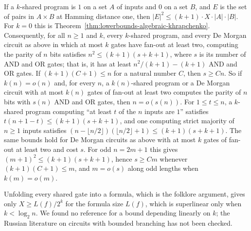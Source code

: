 \begin{theorem}
  If a $k$-shared program is $1$ on a set $A$ of inputs and $0$ on a set $B$,
  and $E$ is the set of pairs in $A \times B$ at Hamming distance one, then
  $|E|^2 \le (k + 1) \cdot X \cdot |A| \cdot |B|$. For $k = 0$ this is
  Theorem~\ref{thm:lowerbounds-algebraic-khrapchenko}. Consequently, for all
  $n \ge 1$ and $k$, every $k$-shared program, and every De Morgan circuit as
  above in which at most $k$ gates have fan-out at least two, computing the
  parity of $n$ bits satisfies $n^2 \le (k + 1)(s + k + 1)$, where $s$ is its
  number of AND and OR gates; that is, it has at least $n^2/(k + 1) - (k + 1)$
  AND and OR gates. If $(k + 1)(C + 1) \le n$ for a natural number $C$, then
  $s \ge C n$. So if $k(n) = o(n)$ and, for every $n$, a $k(n)$-shared program
  or a De Morgan circuit with at most $k(n)$ gates of fan-out at least two
  computes the parity of $n$ bits with $s(n)$ AND and OR gates, then
  $n = o(s(n))$. For $1 \le t \le n$, a $k$-shared program computing ``at least
  $t$ of the $n$ inputs are $1$'' satisfies
  $t(n + 1 - t) \le (k + 1)(s + k + 1)$, and one computing strict majority of
  $n \ge 1$ inputs satisfies
  $(n - \lfloor n/2 \rfloor)(\lfloor n/2 \rfloor + 1) \le (k + 1)(s + k + 1)$.
  The same bounds hold for De Morgan circuits as above with at most $k$ gates
  of fan-out at least two and cost $s$. For odd $n = 2m + 1$ this gives
  $(m + 1)^2 \le (k + 1)(s + k + 1)$, hence $s \ge Cm$ whenever
  $(k + 1)(C + 1) \le m$, and $m = o(s)$ along odd lengths when $k(m) = o(m)$.

  Unfolding every shared gate into a formula, which is the folklore argument,
  gives only $X \ge L(f)/2^k$ for the formula size $L(f)$, which is superlinear
  only when $k < \log_2 n$. We found no reference for a bound depending
  linearly on $k$; the Russian literature on circuits with bounded branching
  has not been checked.
\end{theorem}
